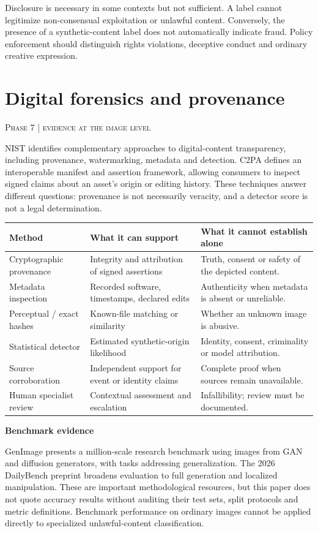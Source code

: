 \documentclass[11pt,a4paper]{article}
\newcommand{\sect}[2]{\section{#1}\textcolor{muted}{\small\textsc{#2}}\par\vspace{2mm}}
\newcommand{\sub}[1]{\vspace{1mm}\textbf{#1}\par}
\begin{document}
Disclosure is necessary in some contexts but not sufficient. A label cannot legitimize non-consensual exploitation or unlawful content. Conversely, the presence of a synthetic-content label does not automatically indicate fraud. Policy enforcement should distinguish rights violations, deceptive conduct and ordinary creative expression.


\clearpage\sect{Digital forensics and provenance}{Phase 7 | evidence at the image level}

NIST identifies complementary approaches to digital-content transparency, including provenance, watermarking, metadata and detection. C2PA defines an interoperable manifest and assertion framework, allowing consumers to inspect signed claims about an asset's origin or editing history. These techniques answer different questions: provenance is not necessarily veracity, and a detector score is not a legal determination. \cite{nist,c2pa}


\begin{center}\small\begin{tabularx}{\linewidth}{@{}YYY@{}}\toprule
\textbf{Method} & \textbf{What it can support} & \textbf{What it cannot establish alone}\\\midrule
Cryptographic provenance & Integrity and attribution of signed assertions & Truth, consent or safety of the depicted content.\\
Metadata inspection & Recorded software, timestamps, declared edits & Authenticity when metadata is absent or unreliable.\\
Perceptual / exact hashes & Known-file matching or similarity & Whether an unknown image is abusive.\\
Statistical detector & Estimated synthetic-origin likelihood & Identity, consent, criminality or model attribution.\\
Source corroboration & Independent support for event or identity claims & Complete proof when sources remain unavailable.\\
Human specialist review & Contextual assessment and escalation & Infallibility; review must be documented.\\\bottomrule\end{tabularx}\end{center}

\sub{Benchmark evidence}

GenImage presents a million-scale research benchmark using images from GAN and diffusion generators, with tasks addressing generalization. The 2026 DailyBench preprint broadens evaluation to full generation and localized manipulation. These are important methodological resources, but this paper does not quote accuracy results without auditing their test sets, split protocols and metric definitions. Benchmark performance on ordinary images cannot be applied directly to specialized unlawful-content classification. \cite{genimage,dailybench}
\end{document}
